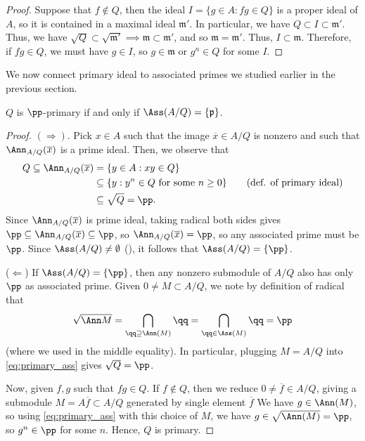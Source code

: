 \begin{proof}
    Suppose that $f\notin Q$, then the ideal
    $I =\{g\in A : fg\in Q\}$ is a proper ideal of $A$,
    so it is contained in a maximal ideal $\mathfrak m'$.
    In particular, we have $Q\subset I\subset\mathfrak m'$.
    Thus, we have $\sqrt Q\subset\sqrt{\mathfrak m'}
    \implies \mathfrak m \subset\mathfrak m'$,
    and so $\mathfrak m = \mathfrak m'$.
    Thus, $I\subset\mathfrak m$.
    Therefore, if $fg\in Q$, we must have $g\in I$,
    so $g\in\mathfrak m$
    or $g^n\in Q$ for some $I$.
\end{proof}
We now connect primary ideal to associated primes
we studied earlier in the previous section.
\begin{theorem}
    \label{thm:primary_one_ass}
    $Q$ is $\pp$-primary if and only if 
    $\Ass(A/Q) = \{\mathfrak p\}$.
\end{theorem}
\begin{proof}
    $(\Rightarrow)$. 
    Pick $x\in A$ such that
    the image $\overline x\in A/Q$ is nonzero and
    such that $\Ann_{A/Q}(\overline x)$ is a prime ideal.
    Then, we observe that
    \begin{align*}
        Q \subseteq \Ann_{A/Q}(\overline x) 
        &= \{y \in A : xy\in Q\} \\
        &\subseteq \{y : y^n\in Q\text{ for some }n\geq 0\} 
        \tag{def. of primary ideal}\\
        &\subseteq \sqrt{Q} = \pp.
    \end{align*}
    Since $\Ann_{A/Q}(\overline x)$ is prime ideal,
    taking radical both sides gives 
    $\pp\subseteq \Ann_{A/Q}(\overline x)
    \subseteq \pp$, so $\Ann_{A/Q}(\overline x) = \pp$,
    so any associated prime must be $\pp$.
    Since $\Ass(A/Q)\neq\emptyset$ (),
    it follows that $\Ass(A/Q)=\{\pp\}$.
    
    ($\Leftarrow$) If $\Ass(A/Q) = \{\pp\}$,
    then any nonzero submodule of $A/Q$ also has only $\pp$
    as associated prime.
    Given $0\neq M\subset A/Q$, we note by definition 
    of radical that
    \begin{equation}
    \label{eq:primary_ass}
    \sqrt{\Ann M} = \bigcap_{\qq\supseteq\Ann(M)} \qq
    = \bigcap_{\qq\in\Ass(M)}\qq = \pp
    \end{equation}
    (where we used  in the middle equality).
    In particular, plugging $M=A/Q$ into \eqref{eq:primary_ass} gives $\sqrt Q = \pp$.

    Now, given $f,g$ such that $fg\in Q$.
    If $f\notin Q$, then we reduce
    $0\neq \overline f\in A/Q$,
    giving a submodule $M=A\overline f \subset A/Q$ 
    generated by single element $\overline f$
    We have $g\in\Ann(M)$, so using \eqref{eq:primary_ass}
    with this choice of $M$, we have
    $g\in\sqrt{\Ann(M)} = \pp$, so $g^n\in\pp$
    for some $n$. Hence, $Q$ is primary.
\end{proof}

